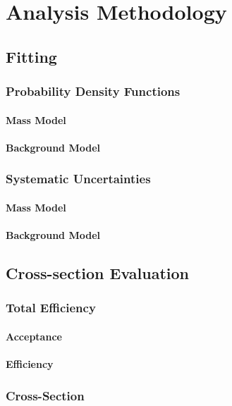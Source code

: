 \chapter[\leavevmode\newline Analysis Methodology]{Analysis Methodology}
\label{chap:Chapter_4}
\section{Fitting}
\subsection{Probability Density Functions}
\subsubsection{Mass Model}
\subsubsection{Background Model}
\subsection{Systematic Uncertainties}
\subsubsection{Mass Model}
\subsubsection{Background Model}
\section{Cross-section Evaluation}
\subsection{Total Efficiency}
\subsubsection{Acceptance}
\subsubsection{Efficiency}
\subsection{Cross-Section}
\lipsum[4]
